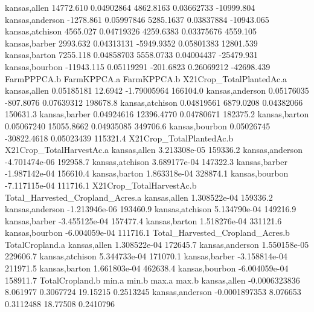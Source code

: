 \documentclass{report}
\begin{document}
\begin{Schunk}
\begin{Soutput}
kansas,allen     14772.610 0.04902864   4862.8163  0.03662733  -10999.804
kansas,anderson  -1278.861 0.05997846   5285.1637  0.03837884  -10943.065
kansas,atchison   4565.027 0.04719326   4259.6383  0.03375676    4559.105
kansas,barber     2993.632 0.04313131  -5949.9352  0.05801383   12801.539
kansas,barton     7255.118 0.04858703   5558.0733  0.04004437  -25479.931
kansas,bourbon  -11943.115 0.05119291   -201.6823  0.26069212  -42698.439
                FarmPPPCA.b FarmKPPCA.a FarmKPPCA.b X21Crop_TotalPlantedAc.a
kansas,allen     0.05185181     12.6942 -1.79005964                 166104.0
kansas,anderson  0.05176035   -807.8076  0.07639312                 198678.8
kansas,atchison  0.04819561   6879.0208  0.04382066                 150631.3
kansas,barber    0.04924616  12396.4770  0.04780671                 182375.2
kansas,barton    0.05067240  15055.8662  0.04935085                 349706.6
kansas,bourbon   0.05026745 -30822.4618  0.05023439                 115321.4
                X21Crop_TotalPlantedAc.b X21Crop_TotalHarvestAc.a
kansas,allen                3.213308e-05                 159336.2
kansas,anderson            -4.701474e-06                 192958.7
kansas,atchison             3.689177e-04                 147322.3
kansas,barber              -1.987142e-04                 156610.4
kansas,barton               1.863318e-04                 328874.1
kansas,bourbon             -7.117115e-04                 111716.1
                X21Crop_TotalHarvestAc.b Total_Harvested_Cropland_Acres.a
kansas,allen                1.308522e-04                         159336.2
kansas,anderson            -1.213946e-06                         193460.9
kansas,atchison             5.134790e-04                         149216.9
kansas,barber              -3.455125e-04                         157477.4
kansas,barton               1.518276e-04                         331121.6
kansas,bourbon             -6.004059e-04                         111716.1
                Total_Harvested_Cropland_Acres.b TotalCropland.a
kansas,allen                        1.308522e-04        172645.7
kansas,anderson                     1.550158e-05        229606.7
kansas,atchison                     5.344733e-04        171070.1
kansas,barber                      -3.158814e-04        211971.5
kansas,barton                       1.661803e-04        462638.4
kansas,bourbon                     -6.004059e-04        158911.7
                TotalCropland.b    min.a     min.b    max.a     max.b
kansas,allen      -0.0006323836 8.061977 0.3067724 19.15215 0.2513245
kansas,anderson   -0.0001897353 8.076653 0.3112488 18.77508 0.2410796

\end{Soutput}
\end{Schunk}
\end{document}
